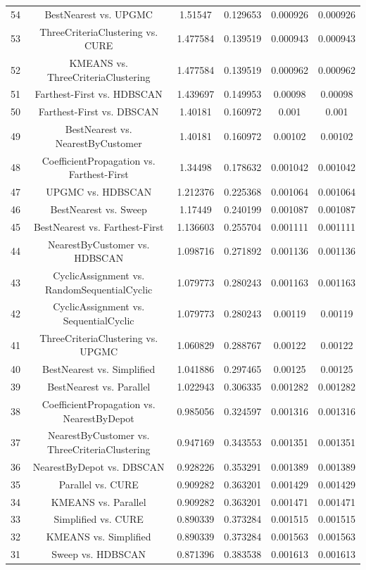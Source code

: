 \documentclass[a4paper,10pt]{article}
\begin{document}
\begin{landscape}
\begin{table}[!htp]
\begin{tabular}{cccccc}
54&BestNearest vs. UPGMC&1.51547&0.129653&0.000926&0.000926\\
53&ThreeCriteriaClustering vs. CURE&1.477584&0.139519&0.000943&0.000943\\
52&KMEANS vs. ThreeCriteriaClustering&1.477584&0.139519&0.000962&0.000962\\
51&Farthest-First vs. HDBSCAN&1.439697&0.149953&0.00098&0.00098\\
50&Farthest-First vs. DBSCAN&1.40181&0.160972&0.001&0.001\\
49&BestNearest vs. NearestByCustomer&1.40181&0.160972&0.00102&0.00102\\
48&CoefficientPropagation vs. Farthest-First&1.34498&0.178632&0.001042&0.001042\\
47&UPGMC vs. HDBSCAN&1.212376&0.225368&0.001064&0.001064\\
46&BestNearest vs. Sweep&1.17449&0.240199&0.001087&0.001087\\
45&BestNearest vs. Farthest-First&1.136603&0.255704&0.001111&0.001111\\
44&NearestByCustomer vs. HDBSCAN&1.098716&0.271892&0.001136&0.001136\\
43&CyclicAssignment vs. RandomSequentialCyclic&1.079773&0.280243&0.001163&0.001163\\
42&CyclicAssignment vs. SequentialCyclic&1.079773&0.280243&0.00119&0.00119\\
41&ThreeCriteriaClustering vs. UPGMC&1.060829&0.288767&0.00122&0.00122\\
40&BestNearest vs. Simplified&1.041886&0.297465&0.00125&0.00125\\
39&BestNearest vs. Parallel&1.022943&0.306335&0.001282&0.001282\\
38&CoefficientPropagation vs. NearestByDepot&0.985056&0.324597&0.001316&0.001316\\
37&NearestByCustomer vs. ThreeCriteriaClustering&0.947169&0.343553&0.001351&0.001351\\
36&NearestByDepot vs. DBSCAN&0.928226&0.353291&0.001389&0.001389\\
35&Parallel vs. CURE&0.909282&0.363201&0.001429&0.001429\\
34&KMEANS vs. Parallel&0.909282&0.363201&0.001471&0.001471\\
33&Simplified vs. CURE&0.890339&0.373284&0.001515&0.001515\\
32&KMEANS vs. Simplified&0.890339&0.373284&0.001563&0.001563\\
31&Sweep vs. HDBSCAN&0.871396&0.383538&0.001613&0.001613\\

\end{tabular}
\end{table}
\end{landscape}
\end{document}
